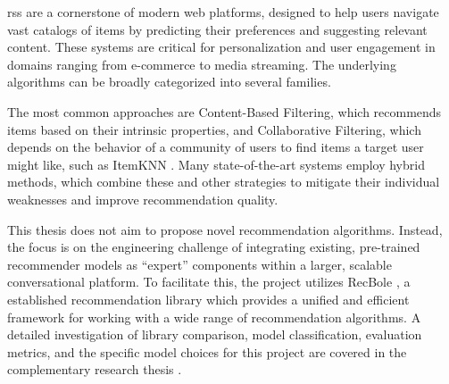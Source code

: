 \aclp{rs} are a cornerstone of modern web platforms, designed to help users navigate vast catalogs of items by predicting their preferences and suggesting relevant content. These systems are critical for personalization and user engagement in domains ranging from e-commerce to media streaming. The underlying algorithms can be broadly categorized into several families.

The most common approaches are Content-Based Filtering, which recommends items based on their intrinsic properties, and Collaborative Filtering, which depends on the behavior of a community of users to find items a target user might like, such as ItemKNN \cite{ITEMKNN}. Many state-of-the-art systems employ hybrid methods, which combine these and other strategies to mitigate their individual weaknesses and improve recommendation quality.

This thesis does not aim to propose novel recommendation algorithms. Instead, the focus is on the engineering challenge of integrating existing, pre-trained recommender models as ``expert'' components within a larger, scalable conversational platform. To facilitate this, the project utilizes RecBole \cite{RECBOLE}, a established recommendation library which provides a unified and efficient framework for working with a wide range of recommendation algorithms. A detailed investigation of library comparison, model classification, evaluation metrics, and the specific model choices for this project are covered in the complementary research thesis \cite{MUI2ICSI_THESIS}.